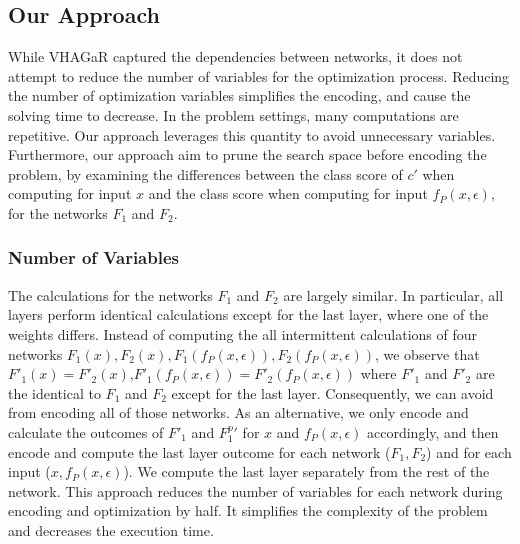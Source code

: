 \begin{comment}
\begin{itemize}
    \item if $\forall{i} (w_{m,k,k_i}\cdot{z^F_{m-1,k_i}}=w_{m,k',k_i}\cdot{z^{\hat{F}}_{m-1,k'_i}})$ then $z^F_{m,k}=z^{\hat{F}}_{m',k'}$ and $a^F_{m,k}=a^{\hat{F}}_{m',k'}$
    \item if $\forall{i} (w_{m,k,k_i}\cdot{z^F_{m-1,k_i}}\ge{w_{m,k',k_i}\cdot{z^{\hat{F}}_{m-1,k'_i}}})$ then $z^F_{m,k}\ge{z^{\hat{F}}_{m',k'}}$ and $a^F_{m,k}\ge{a^{\hat{F}}_{m',k'}}$
    \item if $\forall{i} (w_{m,k,k_i}\cdot{z^F_{m-1,k_i}}\le{w_{m,k',k_i}\cdot{z^{\hat{F}}_{m-1,k'_i}}})$ then $z^F_{m,k}\le{z^{\hat{F}}_{m',k'}}$ and $a^F_{m,k}\le{a^{\hat{F}}_{m',k'}}$
\end{itemize}


\end{comment}

\subsection{Our Approach}
While VHAGaR captured the dependencies between networks, it does not attempt to reduce the number of variables for the optimization process. Reducing the number of optimization variables simplifies the encoding, and cause the solving time to decrease. In the problem settings, many computations are repetitive. Our approach leverages this quantity to avoid unnecessary variables. 
Furthermore, our approach aim to prune the search space before encoding the problem, by examining the differences between the class score of $c'$ when computing for input $x$ and the class score when computing for input $f_P(x,\epsilon)$, for the networks $F_1$ and $F_2$. 

\subsubsection{Number of Variables}
The calculations for the networks $F_1$ and $F_2$ are largely similar. In particular, all layers perform identical calculations except for the last layer, where one of the weights differs.
Instead of computing the all intermittent calculations of four networks $F_1(x),F_2(x),F_1(f_P(x,\epsilon)),F_2(f_P(x,\epsilon))$, we observe that $F'_1(x)=F'_2(x)$,$F'_1(f_P(x,\epsilon))=F'_2(f_P(x,\epsilon))$ where $F'_1$ and $F'_2$ are the identical to $F_1$ and $F_2$ except for the last layer. Consequently, we can avoid from encoding all of those networks. As an alternative, we only encode and calculate the outcomes of $F'_1$ and ${F^{p}_1}'$ for $x$ and $f_P(x,\epsilon)$ accordingly, and then encode and compute the last layer outcome for each network ($F_1,F_2$) and for each input ($x,f_P(x,\epsilon)$). We compute the last layer separately from the rest of the network. This approach reduces the number of variables for each network during encoding and optimization by half. It simplifies the complexity of the problem and decreases the execution time. 

